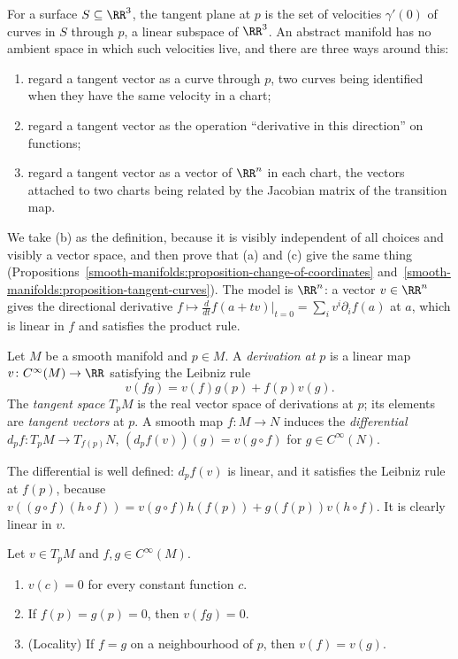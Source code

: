 For a surface $S \subseteq \RR^3$, the tangent plane at $p$ is the set of velocities $\gamma'(0)$ of curves in $S$ through $p$, a linear subspace of $\RR^3$.
An abstract manifold has no ambient space in which such velocities live, and there are three ways around this:
\begin{enumerate}
\item[(a)] regard a tangent vector as a curve through $p$, two curves being identified when they have the same velocity in a chart;
\item[(b)] regard a tangent vector as the operation ``derivative in this direction'' on functions;
\item[(c)] regard a tangent vector as a vector of $\RR^n$ in each chart, the vectors attached to two charts being related by the Jacobian matrix of the
transition map.
\end{enumerate}
We take (b) as the definition, because it is visibly independent of all choices and visibly a vector space, and then prove that (a) and (c) give the same
thing (Propositions~\ref{smooth-manifolds:proposition-change-of-coordinates} and~\ref{smooth-manifolds:proposition-tangent-curves}). The model is $\RR^n$: a
vector $v \in \RR^n$ gives the directional derivative $f \mapsto \frac{d}{dt}f(a + tv)|_{t=0} = \sum_iv^i\partial_if(a)$ at $a$, which is linear in $f$ and satisfies
the product rule.

\begin{definition}\label{smooth-manifolds:definition-tangent-space}
Let $M$ be a smooth manifold and $p \in M$. A \emph{derivation at $p$} is a linear map $v \colon C^\infty(M) \to \RR$ satisfying the Leibniz rule
\[
v(fg) = v(f)g(p) + f(p)v(g).
\]
The \emph{tangent space} $T_pM$ is the real vector space of derivations at $p$; its elements are \emph{tangent vectors} at $p$. A smooth map
$f \colon M \to N$ induces the \emph{differential} $d_pf \colon T_pM \to T_{f(p)}N$, $(d_pf(v))(g) = v(g \circ f)$ for $g \in C^\infty(N)$.
\end{definition}

The differential is well defined: $d_pf(v)$ is linear, and it satisfies the Leibniz rule at $f(p)$, because
$v((g \circ f)(h \circ f)) = v(g \circ f)h(f(p)) + g(f(p))v(h \circ f)$. It is clearly linear in $v$.

\begin{lemma}\label{smooth-manifolds:lemma-derivations}
Let $v \in T_pM$ and $f, g \in C^\infty(M)$.
\begin{enumerate}
\item $v(c) = 0$ for every constant function $c$.
\item If $f(p) = g(p) = 0$, then $v(fg) = 0$.
\item (Locality) If $f = g$ on a neighbourhood of $p$, then $v(f) = v(g)$.
\end{enumerate}
\end{lemma}

